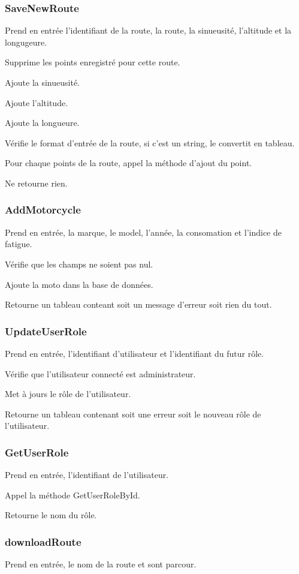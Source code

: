 \documentclass[a4paper]{article}
\newcommand{\bdd}{base de données}
\begin{document}
\subsubsection{SaveNewRoute}
Prend en entrée l'identifiant de la route, la route, la sinueusité, l'altitude et la longugeure.

Supprime les points enregistré pour cette route.

Ajoute la sinueusité.

Ajoute l'altitude.

Ajoute la longueure.

Vérifie le format d'entrée de la route, si c'est un string, le convertit en tableau.

Pour chaque points de la route, appel la méthode d'ajout du point.

Ne retourne rien.

\subsubsection{AddMotorcycle}
Prend en entrée, la marque, le model, l'année, la consomation et l'indice de fatigue.

Vérifie que les champs ne soient pas nul.

Ajoute la moto dans la \bdd.

Retourne un tableau conteant soit un message d'erreur soit rien du tout.

\subsubsection{UpdateUserRole}
Prend en entrée, l'identifiant d'utilisateur et l'identifiant du futur rôle.

Vérifie que l'utilisateur connecté est administrateur.

Met à jours le rôle de l'utilisateur.

Retourne un tableau contenant soit une erreur soit le nouveau rôle de l'utilisateur.

\subsubsection{GetUserRole}
Prend en entrée, l'identifiant de l'utilisateur.

Appel la méthode GetUserRoleById.

Retourne le nom du rôle.

\subsubsection{downloadRoute}
Prend en entrée, le nom de la route et sont parcour.
\end{document}
